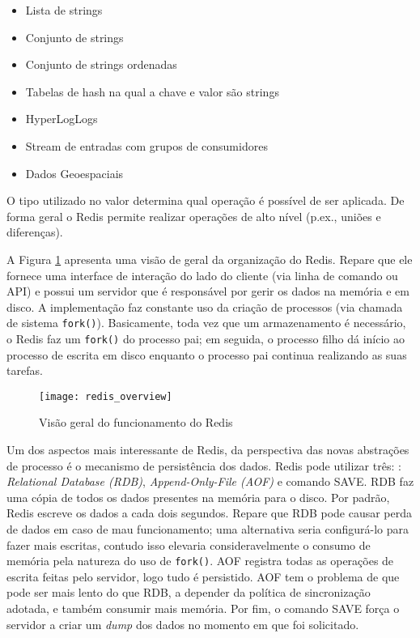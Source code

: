 \begin{itemize}
  \item Lista de strings
  \item Conjunto de strings
  \item Conjunto de strings ordenadas
  \item Tabelas de hash na qual a chave e valor são strings
  \item HyperLogLogs
  \item Stream de entradas com grupos de consumidores
  \item Dados Geoespaciais
\end{itemize}

O tipo utilizado no valor determina qual operação é possível de ser aplicada.
De forma geral o Redis permite realizar operações de alto nível (p.ex., uniões
e diferenças).

A Figura \ref{fig:redis} apresenta uma visão de geral da organização do Redis.
Repare que ele fornece uma interface de interação do lado do cliente (via
linha de comando ou API) e possui um servidor que é responsável por gerir os dados na memória e em disco.
A implementação faz constante uso da criação de processos (via
chamada de sistema \texttt{fork()}). Basicamente, toda vez que um armazenamento
é necessário, o Redis faz um \texttt{fork()} do processo pai; em seguida, o
processo filho dá início ao processo de escrita em disco enquanto o processo
pai continua realizando as suas tarefas. 

\begin{figure}[!h]
  \centering
  \texttt{[image: redis\_overview]}
  \caption{Visão geral do funcionamento do Redis}
  \label{fig:redis}
\end{figure}

Um dos aspectos mais interessante de Redis, da perspectiva das novas
abstrações de processo é o mecanismo de persistência dos dados. Redis pode
utilizar três: \citep{redisio}: \emph{Relational Database (RDB)},
\emph{Append-Only-File (AOF)} e comando SAVE. RDB faz uma cópia de todos os
dados presentes na memória para o disco. Por padrão, Redis escreve os dados a
cada dois segundos. Repare que RDB pode causar perda de dados em caso de mau
funcionamento; uma alternativa seria configurá-lo para fazer mais escritas,
contudo isso elevaria consideravelmente o consumo de memória pela natureza do
uso de \texttt{fork()}. AOF registra todas as operações de escrita feitas pelo
servidor, logo tudo é persistido. AOF tem o problema de que pode ser mais lento
do que RDB, a depender da política de sincronização adotada, e também consumir
mais memória.  Por fim, o comando SAVE força o servidor a criar um \emph{dump}
dos dados no momento em que foi solicitado.

